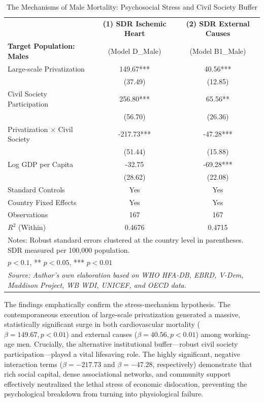 \documentclass[12pt]{article}
\begin{document}
\begin{table}[H]
\centering
\caption{The Mechanisms of Male Mortality: Psychosocial Stress and Civil Society Buffer}
\label{tab:mechanisms}
\footnotesize
\begin{tabular}{l c c}
\toprule
 & \textbf{(1) SDR Ischemic Heart} & \textbf{(2) SDR External Causes} \\
\textbf{Target Population: Males} & (Model D\_Male) & (Model B1\_Male) \\
\midrule
Large-scale Privatization & 149.67*** & 40.56*** \\
 & (37.49) & (12.85) \\
Civil Society Participation & 256.80*** & 65.56** \\
 & (56.70) & (26.36) \\
Privatization $\times$ Civil Society & -217.73*** & -47.28*** \\
 & (51.44) & (15.88) \\
Log GDP per Capita & -32.75 & -69.28*** \\
 & (28.62) & (22.08) \\
\midrule
Standard Controls & Yes & Yes \\
Country Fixed Effects & Yes & Yes \\
Observations & 167 & 167 \\
$R^2$ (Within) & 0.4676 & 0.4715 \\
\bottomrule
\multicolumn{3}{l}{\scriptsize Notes: Robust standard errors clustered at the country level in parentheses. SDR measured per 100,000 population.} \\
\multicolumn{3}{l}{\scriptsize * $p < 0.1$, ** $p < 0.05$, *** $p < 0.01$} \\
\multicolumn{3}{l}{\scriptsize \textit{Source: Author's own elaboration based on WHO HFA-DB, EBRD, V-Dem, Maddison Project, WB WDI, UNICEF, and OECD data.}} \\
\end{tabular}
\end{table}

The findings emphatically confirm the stress-mechanism hypothesis. The contemporaneous execution of large-scale privatization generated a massive, statistically significant surge in both cardiovascular 
mortality ($\beta = 149.67, p < 0.01$) and external causes ($\beta = 40.56, p < 0.01$) among working-age men. Crucially, the alternative institutional buffer---robust civil society participation---played a 
vital lifesaving role. The highly significant, negative interaction terms ($\beta = -217.73$ and $\beta = -47.28$, respectively) demonstrate that rich social capital, dense associational networks, and 
community support effectively neutralized the lethal stress of economic dislocation, preventing the psychological breakdown from turning into physiological failure.
\end{document}
